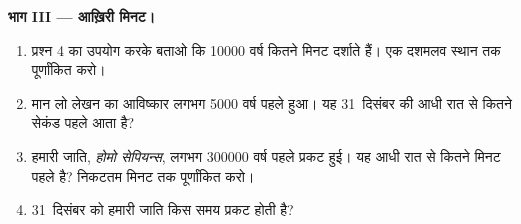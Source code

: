 \begin{problem}
\medskip
\noindent\textbf{भाग III --- आख़िरी मिनट।}\par\nopagebreak
\begin{enumerate}[resume, beginpenalty=10000]
  \item प्रश्न 4 का उपयोग करके बताओ कि \num{10000} वर्ष कितने मिनट दर्शाते हैं।
        एक दशमलव स्थान तक पूर्णांकित करो।
  \item मान लो लेखन का आविष्कार लगभग \num{5000} वर्ष पहले हुआ। यह 31~दिसंबर की
        आधी रात से कितने सेकंड पहले आता है?
  \item हमारी जाति, \emph{होमो सेपियन्स}, लगभग \num{300000} वर्ष पहले प्रकट हुई।
        यह आधी रात से कितने मिनट पहले है? निकटतम मिनट तक
        पूर्णांकित करो।
  \item 31~दिसंबर को हमारी जाति किस समय प्रकट होती है?
\end{enumerate}
\end{problem}
